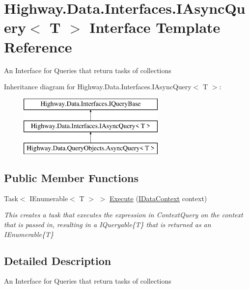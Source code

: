 \hypertarget{interface_highway_1_1_data_1_1_interfaces_1_1_i_async_query-g}{\section{Highway.\-Data.\-Interfaces.\-I\-Async\-Query$<$ T $>$ Interface Template Reference}
\label{interface_highway_1_1_data_1_1_interfaces_1_1_i_async_query-g}
}


An Interface for Queries that return tasks of collections  


Inheritance diagram for Highway.\-Data.\-Interfaces.\-I\-Async\-Query$<$ T $>$\-:\begin{figure}[H]
\begin{center}
\leavevmode
\includegraphics[height=3.000000cm]{interface_highway_1_1_data_1_1_interfaces_1_1_i_async_query-g}
\end{center}
\end{figure}
\subsection*{Public Member Functions}
\begin{DoxyCompactItemize}
\item 
Task$<$ I\-Enumerable$<$ T $>$ $>$ \hyperlink{interface_highway_1_1_data_1_1_interfaces_1_1_i_async_query-g_a32fdccff7dacbdc222b3b4a0c2678870}{Execute} (\hyperlink{interface_highway_1_1_data_1_1_interfaces_1_1_i_data_context}{I\-Data\-Context} context)
\begin{DoxyCompactList}\small\item\em This creates a task that executes the expression in Context\-Query on the context that is passed in, resulting in a I\-Queryable\{\-T\} that is returned as an I\-Enumerable\{\-T\} \end{DoxyCompactList}\end{DoxyCompactItemize}


\subsection{Detailed Description}
An Interface for Queries that return tasks of collections 


